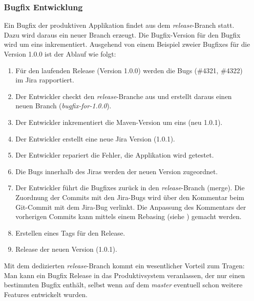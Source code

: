 \subsubsection{Bugfix Entwicklung}
Ein Bugfix der produktiven Applikation findet aus dem \textit{release}-Branch statt. Dazu wird daraus ein neuer Branch erzeugt. Die Bugfix-Version für den Bugfix wird um eins inkrementiert. Ausgehend von einem Beispiel zweier Bugfixes für die Version 1.0.0 ist der Ablauf wie folgt:
\begin{enumerate}
\item Für den laufenden Release (Version 1.0.0) werden die Bugs (\#4321, \#4322) im Jira rapportiert.
\item Der Entwickler checkt den \textit{release}-Branche aus und erstellt daraus einen neuen Branch (\textit{bugfix-for-1.0.0}).
\item Der Entwickler inkrementiert die Maven-Version um eins (neu 1.0.1).
\item Der Entwickler erstellt eine neue Jira Version (1.0.1).
\item Der Entwickler repariert die Fehler, die Applikation wird getestet.
\item Die Bugs innerhalb des Jiras werden der neuen Version zugeordnet.
\item Der Entwickler führt die Bugfixes zurück in den \textit{release}-Branch (merge). Die Zuordnung der Commits mit den Jira-Bugs wird über den Kommentar beim Git-Commit mit dem Jira-Bug verlinkt. Die Anpassung des Kommentars der vorherigen Commits kann mittels einem Rebasing (siehe \cite{dilger201111}) gemacht werden.
\item Erstellen eines Tags für den Release.
\item Release der neuen Version (1.0.1).
\end{enumerate}
Mit dem dedizierten \textit{release}-Branch kommt ein wesentlicher Vorteil zum Tragen: Man kann ein Bugfix Release in das Produktivsystem veranlassen, der nur einen bestimmten Bugfix enthält, selbst wenn auf dem \textit{master} eventuell schon weitere Features entwickelt wurden.

